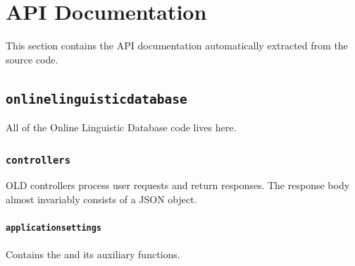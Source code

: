 \documentclass[letterpaper,10pt,english]{sphinxmanual}
\begin{document}
\chapter{API Documentation}
\label{index:api-documentation}\label{index:iso-639-3}
This section contains the API documentation automatically extracted from the
source code.


\section{\texttt{onlinelinguisticdatabase}}
\label{api:module-onlinelinguisticdatabase}\label{api::doc}\label{api:onlinelinguisticdatabase}
All of the Online Linguistic Database code lives here.


\subsection{\texttt{controllers}}
\label{api:controllers}\label{api:module-onlinelinguisticdatabase.controllers}
OLD controllers process user requests and return responses.  The response
body almost invariably consists of a JSON object.
\label{api:module-controllers}

\subsubsection{\texttt{applicationsettings}}
\label{api:applicationsettings}\label{api:module-onlinelinguisticdatabase.controllers.applicationsettings}
Contains the {\hyperref[api:onlinelinguisticdatabase.controllers.applicationsettings.ApplicationsettingsController]{}} and its auxiliary functions.
\label{api:module-applicationsettings}
\end{document}
